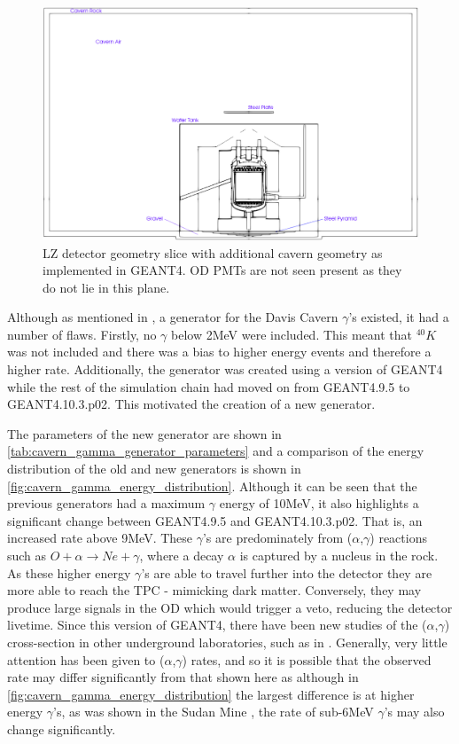 \begin{figure}[!htbp]
\includegraphics[width=\textwidth]{Figures/Geometry/cavern_geometry_with_markings.png}
\centering
\caption{LZ detector geometry slice with additional cavern geometry as implemented in GEANT4. OD PMTs are not seen present as they do not lie in this plane.}
\label{fig:Cavern_Geometry}
\end{figure}

\par
Although as mentioned in \cite{lz_simulations_ref}, a generator for the Davis Cavern $\gamma$'s existed, it had a number of flaws.
Firstly, no $\gamma$ below 2MeV were included.
This meant that $^{40}K$ was not included and there was a bias to higher energy events and therefore a higher rate.
Additionally, the generator was created using a version of GEANT4 while the rest of the simulation chain had moved on from GEANT4.9.5 to GEANT4.10.3.p02. 
This motivated the creation of a new generator.

\par
The parameters of the new generator are shown in \autoref{tab:cavern_gamma_generator_parameters} and a comparison of the energy distribution of the old and new generators is shown in \autoref{fig:cavern_gamma_energy_distribution}.
Although it can be seen that the previous generators had a maximum $\gamma$ energy of 10MeV, it also highlights a significant change between GEANT4.9.5 and GEANT4.10.3.p02.
That is, an increased rate above 9MeV.
These $\gamma$'s are predominately from ($\alpha$,$\gamma$) reactions such as $O + \alpha \to Ne + \gamma$, where a decay $\alpha$ is captured by a nucleus in the rock.
As these higher energy $\gamma$'s are able to travel further into the detector they are more able to reach the TPC - mimicking dark matter.
Conversely, they may produce large signals in the OD which would trigger a veto, reducing the detector livetime.
Since this version of GEANT4, there have been new studies of the ($\alpha$,$\gamma$) cross-section in other underground laboratories, such as in \cite{cavern_gammas_in_Soudan_mine_ref}.
Generally, very little attention has been given to ($\alpha$,$\gamma$) rates, and so it is possible that the observed rate may differ significantly from that shown here as although in \autoref{fig:cavern_gamma_energy_distribution} the largest difference is at higher energy $\gamma$'s, as was shown in the Sudan Mine \cite{cavern_gammas_in_Soudan_mine_ref}, the rate of sub-6MeV $\gamma$'s may also change significantly. 

